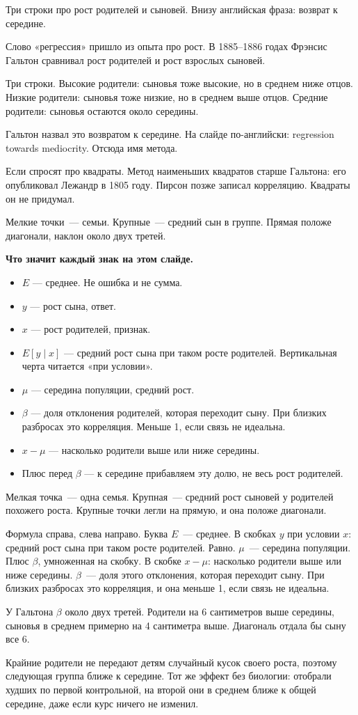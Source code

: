 \documentclass[11pt,a4paper]{article}
\newcommand{\slidehead}[2]{\par\vspace{4mm}{\color{navy}\large\bfseries Слайд #1. #2}\par\vspace{1mm}}
\newcommand{\screen}[1]{\par{\color{ink}\small #1\par}\vspace{1mm}}
\newcommand{\say}[1]{\begin{saybox}#1\end{saybox}}
\newenvironment{signs}{\begin{signbox}{\bfseries Что значит каждый знак на этом слайде.}\par\begin{itemize}[leftmargin=1.15em,itemsep=2pt,topsep=3pt,parsep=0pt]}{\end{itemize}\end{signbox}}
\begin{document}
\slidehead{3}{Гальтон}
\screen{Три строки про рост родителей и сыновей. Внизу английская фраза: возврат к середине.}
\say{Слово «регрессия» пришло из опыта про рост. В 1885--1886 годах Фрэнсис Гальтон сравнивал рост родителей и рост взрослых сыновей.

Три строки. Высокие родители: сыновья тоже высокие, но в среднем ниже отцов. Низкие родители: сыновья тоже низкие, но в среднем выше отцов. Средние родители: сыновья остаются около середины.

Гальтон назвал это возвратом к середине. На слайде по-английски: regression towards mediocrity. Отсюда имя метода.

Если спросят про квадраты. Метод наименьших квадратов старше Гальтона: его опубликовал Лежандр в 1805 году. Пирсон позже записал корреляцию. Квадраты он не придумал.}

\slidehead{4}{Картинка роста}
\screen{Мелкие точки~--- семьи. Крупные~--- средний сын в группе. Прямая положе диагонали, наклон около двух третей.}
\begin{signs}
\item \(E\) — среднее. Не ошибка и не сумма.
\item \(y\) — рост сына, ответ.
\item \(x\) — рост родителей, признак.
\item \(E[y\mid x]\) — средний рост сына при таком росте родителей. Вертикальная черта читается «при условии».
\item \(\mu\) — середина популяции, средний рост.
\item \(\beta\) — доля отклонения родителей, которая переходит сыну. При близких разбросах это корреляция. Меньше 1, если связь не идеальна.
\item \(x-\mu\) — насколько родители выше или ниже середины.
\item Плюс перед \(\beta\) — к середине прибавляем эту долю, не весь рост родителей.
\end{signs}
\say{Мелкая точка~--- одна семья. Крупная~--- средний рост сыновей у родителей похожего роста. Крупные точки легли на прямую, и она положе диагонали.

Формула справа, слева направо. Буква \(E\)~--- среднее. В скобках \(y\) при условии \(x\): средний рост сына при таком росте родителей. Равно. \(\mu\)~--- середина популяции. Плюс \(\beta\), умноженная на скобку. В скобке \(x-\mu\): насколько родители выше или ниже середины. \(\beta\)~--- доля этого отклонения, которая переходит сыну. При близких разбросах это корреляция, и она меньше 1, если связь не идеальна.

У Гальтона \(\beta\) около двух третей. Родители на 6 сантиметров выше середины, сыновья в среднем примерно на 4 сантиметра выше. Диагональ отдала бы сыну все 6.

Крайние родители не передают детям случайный кусок своего роста, поэтому следующая группа ближе к середине. Тот же эффект без биологии: отобрали худших по первой контрольной, на второй они в среднем ближе к общей середине, даже если курс ничего не изменил.}
\end{document}
